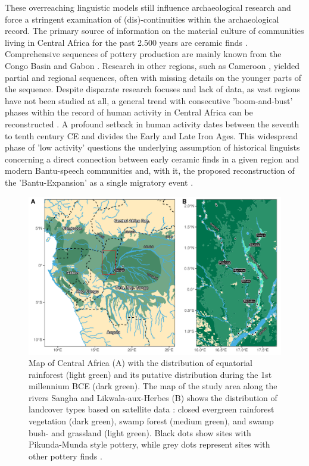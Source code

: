 \documentclass[smallextended,natbib]{svjour3}       %
\begin{document}
These overreaching linguistic models still influence archaeological research \citep{Eggert.2005,Eggert.2012,Eggert.2016a} and force a stringent examination of (dis)-continuities within the archaeological record. The primary source of information on the material culture of communities living in Central Africa for the past 2.500 years are ceramic finds \citep{Eggert.2014}. Comprehensive sequences of pottery production are mainly known from the Congo Basin \citep{Wotzka.1995,Seidensticker.2021e} and Gabon \citep{Clist.20042005}. Research in other regions, such as Cameroon \citep{GouemGouem.20102011,NlendNlend.20132014}, yielded partial and regional sequences, often with missing details on the younger parts of the sequence. Despite disparate research focuses and lack of data, as vast regions have not been studied at all, a general trend with consecutive 'boom-and-bust' phases within the record of human activity in Central Africa can be reconstructed \citep{Oslisly.1998,Oslisly.2013,Oslisly.2013b,Saulieu.2017,deSaulieu.2021a,Seidensticker.2021}. A profound setback in human activity dates between the seventh to tenth century CE and divides the Early and Late Iron Ages. This widespread phase of 'low activity' \citep[Fig.~2]{Seidensticker.2021} questions the underlying assumption of historical linguists concerning a direct connection between early ceramic finds in a given region and modern Bantu-speech communities \citep{Grollemund.2015,Bostoen.2015} and, with it, the proposed reconstruction of the 'Bantu-Expansion' as a single migratory event \citep{Currie.2013,Koile.2022,Grollemund.2023}.

\begin{figure}[!tb]
	\includegraphics[width=\textwidth]{Fig_Map.pdf}
	\caption{Map of Central Africa (A) with the distribution of equatorial rainforest \citep{White.1983} (light green) and its putative distribution during the 1st millennium BCE \citep{Bremond.2017,Maley.2017} (dark green). The map of the study area along the rivers Sangha and Likwala-aux-Herbes (B) shows the distribution of landcover types based on satellite data \citep{Mayaux.2003}: closed evergreen rainforest vegetation (dark green), swamp forest (medium green), and swamp bush- and grassland (light green). Black dots show sites with Pikunda-Munda style pottery, while grey dots represent sites with other pottery finds \citep[11 Fig.~1, 119 Fig.~49]{Seidensticker.2021e}.}
	\label{fig:map}
\end{figure}
\end{document}
